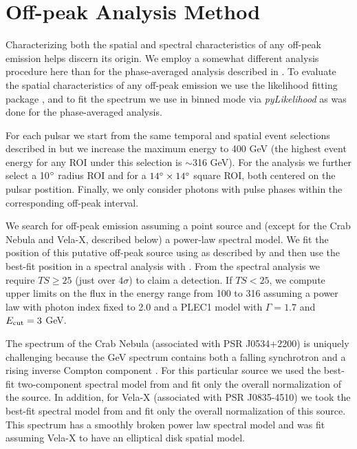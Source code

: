 \section{Off-peak Analysis Method}

Characterizing both the spatial and spectral
characteristics of any off-peak emission helps discern its origin.
We employ a somewhat different analysis procedure here than
for the phase-averaged analysis described in .  To evaluate the spatial characteristics of
any off-peak emission we use the likelihood fitting package \pointlike
\citep[detailed in][]{lande_2012_search-spatially}, and
to fit the spectrum we use \gtlike in binned mode via {\it pyLikelihood} as was done for the
phase-averaged analysis.

For each pulsar we start from
the same temporal and spatial event selections described in 
 but we increase the maximum energy to 400 GeV (the
highest event energy for any ROI under this selection is $\sim$316 GeV).
For the \pointlike analysis we further select a 10$^\circ$ radius ROI
and for \gtlike a $14^\circ\times14^\circ$ square ROI, both centered
on the pulsar postition.  Finally, we only consider photons with 
pulse phases within the corresponding off-peak interval.

We search for off-peak emission
assuming a point source and (except for the Crab Nebula and Vela-X, described below) 
a power-law spectral model.  We fit the position of this
putative off-peak source using \pointlike as described by \citet{nolan_2012_fermi-large}
and then use the best-fit position in a spectral analysis with \gtlike.
From the spectral analysis we require $TS\geq25$ (just over $4\sigma$)
to claim a detection.  If $TS<25$, we compute upper limits on the flux 
in the energy range from 100 \mev to 316 \gev
assuming
a power law with photon index fixed to 2.0 and a PLEC1 model with
$\Gamma=1.7$ and $E_{\rm cut}=3$ GeV.

The spectrum of the Crab Nebula (associated with PSR J0534+2200) is
uniquely challenging because the GeV spectrum contains both a falling
synchrotron and a rising inverse Compton component \citep{abdo_2010a_fermi-large}.
For this particular source we used the best-fit two-component spectral
model from \cite{buehler_2012a_gamma-ray-activity} and fit only the overall
normalization of the source. 
In addition, for Vela-X (associated with PSR J0835-4510) we took the
best-fit spectral model from \cite{grondin_2013a_vela-x-pulsar} and fit only the overall
normalization of this source. This spectrum has a smoothly broken power
law spectral model and was fit assuming Vela-X to have an elliptical
disk spatial model.

